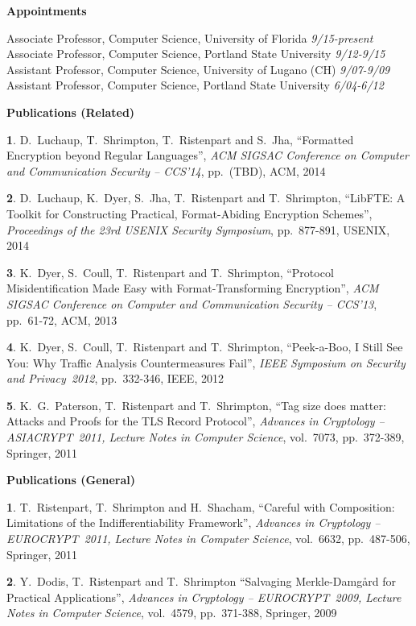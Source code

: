 \documentclass{article}[11pt]
\newcommand{\drop}{\protect{\vspace{1.2ex}}}
\newlength{\headwidth}
\newlength{\sepwidth}
\newlength{\itemwidth}
\newcommand{\resitem}[2]{\noindent\vspace{.15in}\parbox[t]{\headwidth}{\bf{#1}}\hspace{\sepwidth}\parbox[t]{\itemwidth}{#2}}
\newcommand{\pf}{\it}
\begin{document}
\begin{noindent}
\newcommand{\num}[1]{{\textbf{#1}.}}

\vspace{-2ex}

\resitem{Appointments}
{
Associate Professor, Computer Science, University of Florida
\hfill {\it 9/15-present}\\
Associate Professor, Computer Science, Portland State University
\hfill {\it 9/12-9/15}\\
Assistant Professor, Computer Science, University of Lugano (CH)
\hfill {\it 9/07-9/09} \\
Assistant Professor, Computer Science, Portland State University
\hfill {\it 6/04-6/12}
}

\resitem{Publications (Related)}
{
\num{1}
D.\ Luchaup, T.\ Shrimpton, T.\ Ristenpart and S.\ Jha,
``Formatted Encryption beyond Regular Languages'',
{\pf ACM SIGSAC Conference on Computer and Communication Security -- CCS'14},
pp.\ (TBD),
ACM, 2014

\drop
\num{2}
D.\ Luchaup, K.\ Dyer, S.\ Jha, T.\ Ristenpart and T.\ Shrimpton, 
``LibFTE: A Toolkit for Constructing Practical, Format-Abiding Encryption Schemes'',
{\pf Proceedings of the 23rd USENIX Security Symposium},
pp.\ 877-891,
USENIX, 2014

\drop
\num{3}
K.\ Dyer, S.\ Coull, T.\ Ristenpart and T.\ Shrimpton,
``Protocol Misidentification Made Easy with Format-Transforming Encryption'',
{\pf ACM SIGSAC Conference on Computer and Communication Security -- CCS'13},
pp.\ 61-72,
ACM, 2013

\drop
\num{4}
K.\ Dyer, S.\ Coull, T.\ Ristenpart and T.\ Shrimpton,
``Peek-a-Boo, I Still See You: Why Traffic Analysis Countermeasures
Fail'', {\pf IEEE Symposium on Security and Privacy~2012},
pp.\ 332-346,
IEEE, 2012

\drop
\num{5}
K.\ G.\ Paterson, T.\ Ristenpart and T.\ Shrimpton,
``Tag size does matter: Attacks and Proofs for the TLS Record
Protocol'',
{\pf Advances in Cryptology -- ASIACRYPT~2011, Lecture Notes in
  Computer Science},
vol.\ 7073,
pp.\ 372-389,
Springer, 2011

}


\resitem{Publications (General)}{
\num{1}
T.\ Ristenpart, T.\ Shrimpton and H.\ Shacham,
``Careful with Composition: Limitations of the Indifferentiability
Framework'',
{\pf Advances in Cryptology -- EUROCRYPT~2011,
Lecture Notes in Computer Science},
vol.\ 6632,
pp.\ 487-506,
Springer, 2011

\drop
\num{2} Y.\ Dodis, T.\ Ristenpart and T.\ Shrimpton
``Salvaging Merkle-Damg{\aa}rd for Practical Applications'',
{\pf Advances in
Cryptology -- EUROCRYPT~2009, Lecture Notes in Computer Science}, vol.\
4579, pp.\ 371-388, Springer, 2009

}
\end{noindent}
\end{document}
